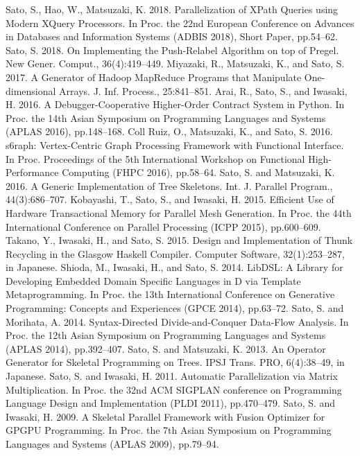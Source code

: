 \documentclass[a4paper,dvipdfmx]{article}
\newcounter{pubcount}
\begin{document}
\begin{thebibliography}{100}
  Sato, S., Hao, W., Matsuzaki, K. 2018. Parallelization of XPath Queries using Modern XQuery Processors. In Proc. the 22nd European Conference on Advances in Databases and Information Systems (ADBIS 2018), Short Paper, pp.54–62.
  Sato, S. 2018. On Implementing the Push-Relabel Algorithm on top of Pregel. New Gener. Comput., 36(4):419–449.
  Miyazaki, R., Matsuzaki, K., and Sato, S. 2017. A Generator of Hadoop MapReduce Programs that Manipulate One-dimensional Arrays. J. Inf. Process., 25:841–851.
  Arai, R., Sato, S., and Iwasaki, H. 2016. A Debugger-Cooperative Higher-Order Contract System in Python. In Proc. the 14th Asian Symposium on Programming Languages and Systems (APLAS 2016), pp.148–168.
  Coll Ruiz, O., Matsuzaki, K., and Sato, S. 2016. s6raph: Vertex-Centric Graph Processing Framework with Functional Interface. In Proc. Proceedings of the 5th International Workshop on Functional High-Performance Computing (FHPC 2016), pp.58–64.
  Sato, S. and Matsuzaki, K. 2016. A Generic Implementation of Tree Skeletons. Int. J. Parallel Program., 44(3):686–707.
  Kobayashi, T., Sato, S., and Iwasaki, H. 2015. Efficient Use of Hardware Transactional Memory for Parallel Mesh Generation. In Proc. the 44th International Conference on Parallel Processing (ICPP 2015), pp.600–609.
  Takano, Y., Iwasaki, H., and Sato, S. 2015. Design and Implementation of Thunk Recycling in the Glasgow Haskell Compiler. Computer Software, 32(1):253–287, in Japanese.
  Shioda, M., Iwasaki, H., and Sato, S. 2014. LibDSL: A Library for Developing Embedded Domain Specific Languages in D via Template Metaprogramming. In Proc. the 13th International Conference on Generative Programming: Concepts and Experiences (GPCE 2014), pp.63–72.
  Sato, S. and Morihata, A. 2014. Syntax-Directed Divide-and-Conquer Data-Flow Analysis. In Proc. the 12th Asian Symposium on Programming Languages and Systems (APLAS 2014), pp.392–407.
  Sato, S. and Matsuzaki, K. 2013. An Operator Generator for Skeletal Programming on Trees. IPSJ Trans. PRO, 6(4):38–49, in Japanese.
  Sato, S. and Iwasaki, H. 2011. Automatic Parallelization via Matrix Multiplication. In Proc. the 32nd ACM SIGPLAN conference on Programming Language Design and Implementation (PLDI 2011), pp.470–479.
  Sato, S. and Iwasaki, H. 2009. A Skeletal Parallel Framework with Fusion Optimizer for GPGPU Programming. In Proc. the 7th Asian Symposium on Programming Languages and Systems (APLAS 2009), pp.79–94.
 \setcounter{pubcount}{\theenumiv}
\end{thebibliography}
\end{document}
